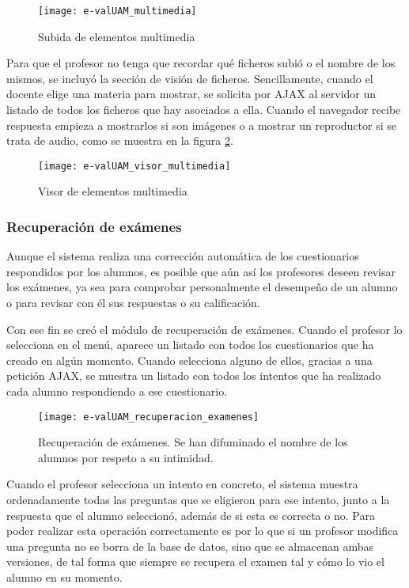 \begin{figure}[htp!]
	\centering
	\texttt{[image: e-valUAM\_multimedia]}
	\caption{Subida de elementos multimedia}
	\label{fig:e-valUAM multimedia profesor}
\end{figure}

Para que el profesor no tenga que recordar qué ficheros subió o el nombre de los mismos, se incluyó la sección de visión de ficheros. Sencillamente, cuando el docente elige una materia para mostrar, se solicita por AJAX al servidor un listado de todos los ficheros que hay asociados a ella. Cuando el navegador recibe respuesta empieza a mostrarlos si son imágenes o a mostrar un reproductor si se trata de audio, como se muestra en la figura \ref{fig:e-valUAM visor multimedia profesor}.

\begin{figure}[htp!]
	\centering
	\texttt{[image: e-valUAM\_visor\_multimedia]}
	\caption{Visor de elementos multimedia}
	\label{fig:e-valUAM visor multimedia profesor}
\end{figure}

\subsubsection{Recuperación de exámenes}

Aunque el sistema realiza una corrección automática de los cuestionarios respondidos por los alumnos, es posible que aún así los profesores deseen revisar los exámenes, ya sea para comprobar personalmente el desempeño de un alumno o para revisar con él sus respuestas o su calificación.

Con ese fin se creó el módulo de recuperación de exámenes. Cuando el profesor lo selecciona en el menú, aparece un listado con todos los cuestionarios que ha creado en algún momento. Cuando selecciona alguno de ellos, gracias a una petición AJAX, se muestra un listado con todos los intentos que ha realizado cada alumno respondiendo a ese cuestionario.

\begin{figure}[htp!]
	\centering
	\texttt{[image: e-valUAM\_recuperacion\_examenes]}
	\caption[Recuperación de exámenes]{Recuperación de exámenes. Se han difuminado el nombre de los alumnos por respeto a su intimidad.}
	\label{fig:e-valUAM recuperacion examenes profesor}
\end{figure}

Cuando el profesor selecciona un intento en concreto, el sistema muestra ordenadamente todas las preguntas que se eligieron para ese intento, junto a la respuesta que el alumno seleccionó, además de si esta es correcta o no. Para poder realizar esta operación correctamente es por lo que si un profesor modifica una pregunta no se borra de la base de datos, sino que se almacenan ambas versiones, de tal forma que siempre se recupera el examen tal y cómo lo vio el alumno en su momento.

